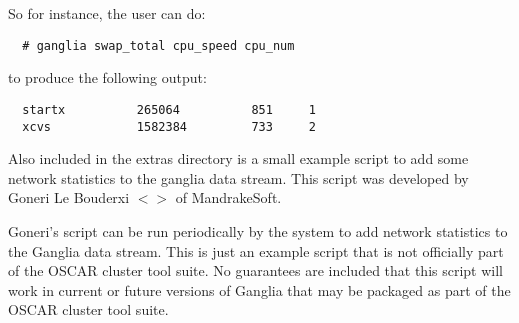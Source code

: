 \noindent So for instance, the user can do:

\begin{verbatim}
  # ganglia swap_total cpu_speed cpu_num
\end{verbatim}

\noindent to produce the following output:

\begin{verbatim}
  startx          265064          851     1
  xcvs            1582384         733     2
\end{verbatim}

Also included in the extras directory is a small example script to add
some network statistics to the ganglia data stream.
This script was developed by Goneri Le Bouderxi
$<$$>$ of MandrakeSoft.
        
Goneri's  script can be run
periodically by the  system to add network statistics to the
Ganglia data stream. This is just an example script that is not officially
part of the OSCAR cluster tool suite. No guarantees are included that this
script will work in current or future versions of Ganglia that may be
packaged as part of the OSCAR cluster tool suite.


